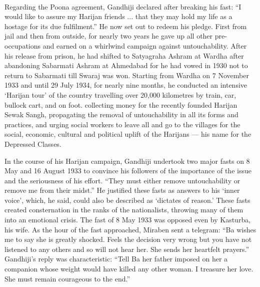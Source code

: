 \begin{multicols}{2}
\paragraph*{}
Regarding the Poona agreement, Gandhiji declared after breaking his fast: ``I would like to assure my Harijan friends ... that they may hold my life as a hostage for its due fulfilment.'' He now set out to redeem his pledge. First from jail and then from outside, for nearly two years he gave up all other pre-occupations and earned on a whirlwind campaign against untouchability. After his release from prison, he had shifted to Satyagraha Ashram at Wardha after abandoning Sabarmati Ashram at Ahmedabad for he had vowed in 1930 not to return to Sabarmati till Swaraj was won. Starting from Wardha on 7 November 1933 and until 29 July 1934, for nearly nine months, he conducted an intensive `Harijan tour' of the country travelling over 20,000 kilometres by train, car, bullock cart, and on foot. collecting money for the recently founded Harijan Sewak Sangh, propagating the removal of untouchability in all its forms and practices, and urging social workers to leave all and go to the villages for the social, economic, cultural and political uplift of the Harijans --- his name for the Depressed Classes.

In the course of his Harijan campaign, Gandhiji undertook two major fasts on 8 May and 16 August 1933 to convince his followers of the importance of the issue and the seriousness of his effort. ``They must either remove untouchability or remove me from their midst.'' He justified these fasts as answers to his `inner voice', which, he said, could also be described as `dictates of reason.' These fasts created consternation in the ranks of the nationalists, throwing many of them into an emotional crisis. The fast of 8 May 1933 was opposed even by Kasturba, his wife. As the hour of the fast approached, Miraben sent a telegram: ``Ba wishes me to say she is greatly shocked. Feels the decision very wrong but you have not listened to any others and so will not hear her. She sends her heartfelt prayers.'' Gandhiji's reply was characteristic: ``Tell Ba her father imposed on her a companion whose weight would have killed any other woman. I treasure her love. She must remain courageous to the end.''


\end{multicols}
